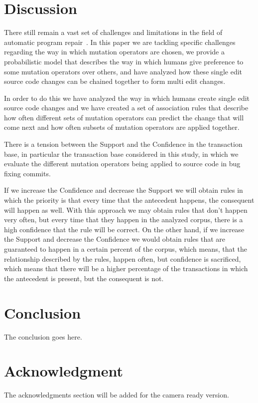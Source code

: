 \documentclass[conference]{IEEEtran}
\begin{document}
\section{Discussion}
There still remain a vast set of challenges and limitations in the field of automatic program repair~\cite{Qi15}. In this paper we are tackling specific challenges regarding the way in which mutation operators are chosen, we provide a probabilistic model that describes the way in which humans give preference to some mutation operators over others, and have analyzed how these single edit source code changes can be chained together to form multi edit changes.

In order to do this we have analyzed the way in which humans create single edit source code changes and we have created a set of association rules that describe how often different sets of mutation operators can predict the change that will come next and how often subsets of mutation operators are applied together.

There is a tension between the Support and the Confidence in the transaction base, in particular the transaction base considered in this study, in which we evaluate the different mutation operators being applied to source code in bug fixing commits. 

If we increase the Confidence and decrease the Support we will obtain rules in which the priority is that every time that the antecedent happens, the consequent will happen as well. With this approach we may obtain rules that don't happen very often, but every time that they happen in the analyzed corpus, there is a high confidence that the rule will be correct. On the other hand, if we increase the Support and decrease the Confidence we would obtain rules that are guaranteed to happen in a certain percent of the corpus, which means, that the relationship described by the rules, happen often, but confidence is sacrificed, which means that there will be a higher percentage of the transactions in which the antecedent is present, but the consequent is not. 


\section{Conclusion}
The conclusion goes here.






\section*{Acknowledgment}
The acknowledgments section will be added for the camera ready version. 
\end{document}
